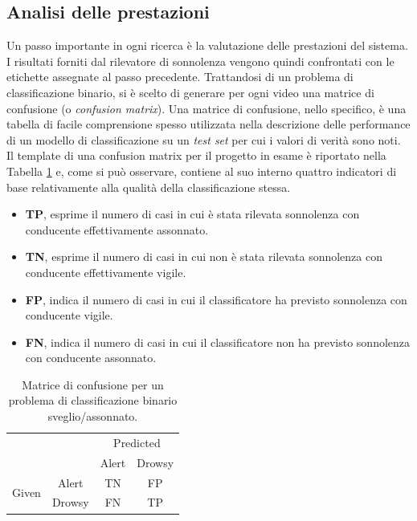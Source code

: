 \documentclass[12pt]{article}
\begin{document}
\subsection{Analisi delle prestazioni}
Un passo importante in ogni ricerca è la valutazione delle prestazioni del sistema. I risultati forniti dal rilevatore di sonnolenza vengono quindi confrontati con le etichette assegnate al passo precedente. Trattandosi di un problema di classificazione binario, si è scelto di generare per ogni video una matrice di confusione (o \textit{confusion matrix}). Una matrice di confusione, nello specifico, è una tabella di facile comprensione spesso utilizzata nella descrizione delle performance di un modello di classificazione su un \textit{test set} per cui i valori di verità sono noti. Il template di una confusion matrix per il progetto in esame è riportato nella Tabella \ref{table:cm} e, come si può osservare, contiene al suo interno quattro indicatori di base relativamente alla qualità della classificazione stessa.
\begin{itemize}
	\item \textbf{TP}, esprime il numero di casi in cui è stata rilevata sonnolenza con conducente effettivamente assonnato.
	\item \textbf{TN}, esprime il numero di casi in cui non è stata rilevata sonnolenza con conducente effettivamente vigile.
	\item \textbf{FP}, indica il numero di casi in cui il classificatore ha previsto sonnolenza con conducente vigile.
	\item \textbf{FN}, indica il numero di casi in cui il classificatore non ha previsto sonnolenza con conducente assonnato.
\end{itemize}

\begin{table}[!htb]
	\centering
	\begin{tabular}{cc|c|c|}
		\cline{3-4}
		&        & \multicolumn{2}{c|}{Predicted} \\ \cline{3-4} 
		&        & Alert         & Drowsy         \\ \hline
		\multicolumn{1}{|c|}{\multirow{2}{*}{Given}} & Alert  & TN & FP\\ \cline{2-4} 
		\multicolumn{1}{|c|}{}                       & Drowsy & FN & TP\\ \hline
	\end{tabular}
	\caption{Matrice di confusione per un problema di classificazione binario sveglio/assonnato.}
	\label{table:cm}
\end{table}
\end{document}
